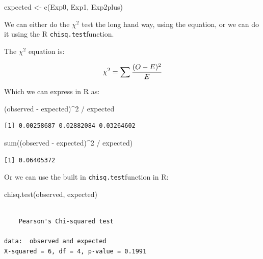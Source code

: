\documentclass[
  letterpaper,
  DIV=11,
  numbers=noendperiod]{scrreprt}
\newenvironment{Shaded}{\begin{snugshade}}{\end{snugshade}}
\newcommand{\DecValTok}[1]{\textcolor[rgb]{0.68,0.00,0.00}{#1}}
\newcommand{\FunctionTok}[1]{\textcolor[rgb]{0.28,0.35,0.67}{#1}}
\newcommand{\NormalTok}[1]{\textcolor[rgb]{0.00,0.23,0.31}{#1}}
\newcommand{\OtherTok}[1]{\textcolor[rgb]{0.00,0.23,0.31}{#1}}
\newcommand{\SpecialCharTok}[1]{\textcolor[rgb]{0.37,0.37,0.37}{#1}}
\begin{document}
\begin{Shaded}
\begin{Highlighting}[]
\NormalTok{expected }\OtherTok{\textless{}{-}} \FunctionTok{c}\NormalTok{(Exp0, Exp1, Exp2plus)}
\end{Highlighting}
\end{Shaded}

We can either do the \(\chi^2\) test the long hand way, using the
equation, or we can do it using the R \texttt{chisq.test}function.

The \(\chi^2\) equation is:

\[
\chi^2 = \sum{(O - E)^2 \over E}
\]

Which we can express in R as:

\begin{Shaded}
\begin{Highlighting}[]
\NormalTok{(observed }\SpecialCharTok{{-}}\NormalTok{ expected)}\SpecialCharTok{\^{}}\DecValTok{2} \SpecialCharTok{/}\NormalTok{ expected}
\end{Highlighting}
\end{Shaded}

\begin{verbatim}
[1] 0.00258687 0.02882084 0.03264602
\end{verbatim}

\begin{Shaded}
\begin{Highlighting}[]
\FunctionTok{sum}\NormalTok{((observed }\SpecialCharTok{{-}}\NormalTok{ expected)}\SpecialCharTok{\^{}}\DecValTok{2} \SpecialCharTok{/}\NormalTok{ expected)}
\end{Highlighting}
\end{Shaded}

\begin{verbatim}
[1] 0.06405372
\end{verbatim}

Or we can use the built in \texttt{chisq.test}function in R:

\begin{Shaded}
\begin{Highlighting}[]
\FunctionTok{chisq.test}\NormalTok{(observed, expected)}
\end{Highlighting}
\end{Shaded}

\begin{verbatim}

    Pearson's Chi-squared test

data:  observed and expected
X-squared = 6, df = 4, p-value = 0.1991
\end{verbatim}
\end{document}
